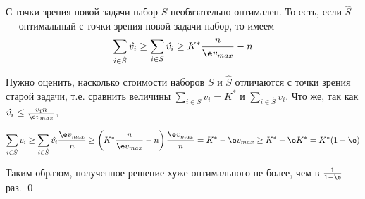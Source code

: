 С точки зрения новой задачи набор $S$ необязательно оптимален. То есть, если $\hat{S}$~-- оптимальный с точки зрения новой задачи набор, то имеем $$\sum_{i\in\hat S}\hat{v_i} \geq \sum_{i\in S} \hat{v_i} \geq K^*\frac{n}{\e v_{max}} - n$$

Нужно оценить, насколько стоимости наборов $S$ и $\hat S$ отличаются с точки зрения старой задачи, т.е. сравнить величины $\sum\limits_{i\in S}v_i = K^*$ и $\sum\limits_{i\in\hat S}v_i$. Что же, так как $\hat{v_i} \leq \frac{v_i n}{\e v_{max}}$,

$$\sum_{i\in\hat S}v_i \geq \sum_{i\in\hat S} \hat{v_i} \frac{\e v_{max}}{n} \geq \left(K^*\frac{n}{\e v_{max}} - n\right)\frac{\e v_{max}}{n} = K^* - \e v_{max} \geq K^* - \e K^* = K^*(1-\e)$$

Таким образом, полученное решение  хуже оптимального не более, чем в $\frac{1}{1-\e}$ раз. \qed
